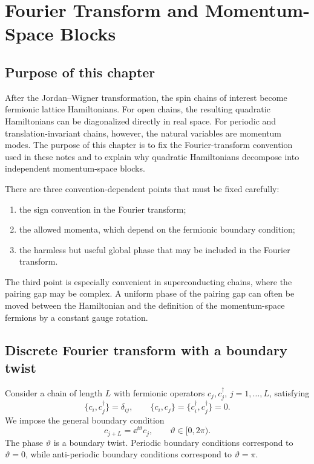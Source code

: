 \chapter{Fourier Transform and Momentum-Space Blocks}
\label{ch:fourier-transform-momentum-blocks}

\section{Purpose of this chapter}

After the Jordan--Wigner transformation, the spin chains of interest become
fermionic lattice Hamiltonians.  For open chains, the resulting quadratic
Hamiltonians can be diagonalized directly in real space.  For periodic and
translation-invariant chains, however, the natural variables are momentum modes.
The purpose of this chapter is to fix the Fourier-transform convention used in
these notes and to explain why quadratic Hamiltonians decompose into independent
momentum-space blocks.

There are three convention-dependent points that must be fixed carefully:
\begin{enumerate}[label=(\roman*)]
    \item the sign convention in the Fourier transform;
    \item the allowed momenta, which depend on the fermionic boundary condition;
    \item the harmless but useful global phase that may be included in the
    Fourier transform.
\end{enumerate}
The third point is especially convenient in superconducting chains, where the
pairing gap may be complex.  A uniform phase of the pairing gap can often be moved
between the Hamiltonian and the definition of the momentum-space fermions by a
constant gauge rotation.

\section{Discrete Fourier transform with a boundary twist}

Consider a chain of length $L$ with fermionic operators $c_j,c_j^\dagger$,
$j=1,\ldots,L$, satisfying
\begin{equation}
    \{c_i,c_j^\dagger\}=\delta_{ij},
    \qquad
    \{c_i,c_j\}=\{c_i^\dagger,c_j^\dagger\}=0.
\end{equation}
We impose the general boundary condition
\begin{equation}
\label{eq:general-fermion-boundary-condition}
    c_{j+L}=\ee^{\ii\vartheta}c_j,
    \qquad
    \vartheta\in[0,2\pi).
\end{equation}
The phase $\vartheta$ is a boundary twist.  Periodic boundary conditions
correspond to $\vartheta=0$, while anti-periodic boundary conditions correspond
to $\vartheta=\pi$.

